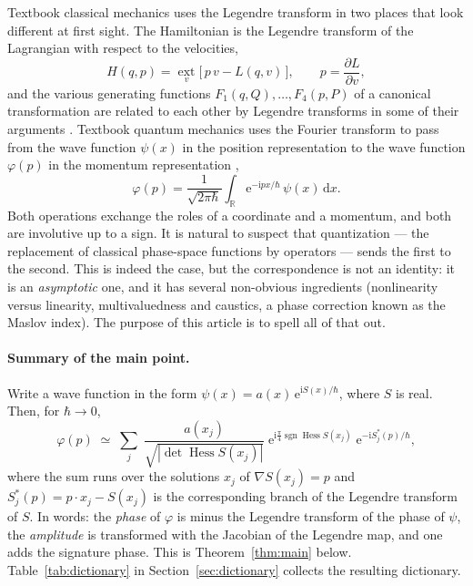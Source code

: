 \documentclass[11pt,a4paper]{article}
\newcommand{\R}{\mathbb{R}}
\newcommand{\ii}{\mathrm{i}}
\newcommand{\dd}{\mathrm{d}}
\newcommand{\ee}{\mathrm{e}}
\newcommand{\hb}{\hbar}
\newcommand{\sgn}{\operatorname{sgn}}
\newcommand{\Hess}{\operatorname{Hess}}
\newcommand{\ext}{\operatorname*{ext}}
\theoremstyle{plain}
\theoremstyle{definition}
\theoremstyle{remark}
\begin{document}
Textbook classical mechanics uses the Legendre transform in two places that look different at first sight. The Hamiltonian is the Legendre transform of the Lagrangian with respect to the velocities,
\begin{equation}
H(q,p)=\ext_{v}\bigl[\,p\,v-L(q,v)\,\bigr],\qquad p=\frac{\partial L}{\partial v},
\end{equation}
and the various generating functions $F_1(q,Q),\dots,F_4(p,P)$ of a canonical transformation are related to each other by Legendre transforms in some of their arguments \cite{Arnold,Goldstein,LL1}. Textbook quantum mechanics uses the Fourier transform to pass from the wave function $\psi(x)$ in the position representation to the wave function $\varphi(p)$ in the momentum representation \cite{Dirac,LL3},
\begin{equation}
\varphi(p)=\frac{1}{\sqrt{2\pi\hb}}\int_{\R}\ee^{-\ii p x/\hb}\,\psi(x)\,\dd x .
\end{equation}
Both operations exchange the roles of a coordinate and a momentum, and both are involutive up to a sign. It is natural to suspect that quantization --- the replacement of classical phase-space functions by operators --- sends the first to the second. This is indeed the case, but the correspondence is not an identity: it is an \emph{asymptotic} one, and it has several non-obvious ingredients (nonlinearity versus linearity, multivaluedness and caustics, a phase correction known as the Maslov index). The purpose of this article is to spell all of that out.

\paragraph{Summary of the main point.}
Write a wave function in the form $\psi(x)=a(x)\,\ee^{\ii S(x)/\hb}$, where $S$ is real. Then, for $\hb\to0$,
\begin{equation}\label{eq:main}
\varphi(p)\;\simeq\;\sum_{j}\;\frac{a(x_j)}{\sqrt{|\det \Hess S(x_j)|}}\;\ee^{\ii\frac{\pi}{4}\sgn \Hess S(x_j)}\;\ee^{-\ii S^*_j(p)/\hb},
\end{equation}
where the sum runs over the solutions $x_j$ of $\nabla S(x_j)=p$ and $S_j^*(p)=p\cdot x_j-S(x_j)$ is the corresponding branch of the Legendre transform of $S$. In words: the \emph{phase} of $\varphi$ is minus the Legendre transform of the phase of $\psi$, the \emph{amplitude} is transformed with the Jacobian of the Legendre map, and one adds the signature phase. This is Theorem~\ref{thm:main} below. Table~\ref{tab:dictionary} in Section~\ref{sec:dictionary} collects the resulting dictionary.
\end{document}
